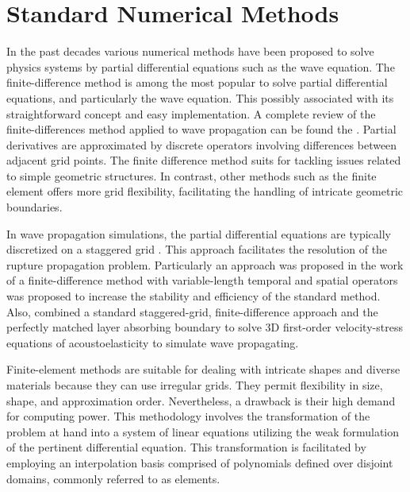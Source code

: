 \documentclass[11pt,twoside]{article}
\begin{document}
\section{Standard Numerical Methods}\label{sec:standard_numerical_methods}

In the past decades various numerical methods have been proposed to solve physics systems by partial differential 
equations such as the wave equation. The finite-difference method is among the most 
popular to solve partial differential equations, and particularly the wave equation. This possibly associated with 
its straightforward concept and easy implementation. A complete review of the finite-differences method applied to 
wave propagation can be found the . Partial derivatives are approximated by discrete operators 
involving differences between adjacent grid points. The finite difference method suits for tackling issues related to 
simple geometric structures. In contrast, other methods such as the finite element offers more grid flexibility, 
facilitating the handling of intricate geometric boundaries.

In wave propagation simulations, the partial differential equations are typically discretized on a staggered grid 
\citep{madariaga_dynamics_1976,Virieux1986}. This approach facilitates the resolution of the rupture propagation 
problem. Particularly an approach was proposed in the work of  a finite-difference method 
with variable-length temporal and spatial operators was proposed to increase the stability and efficiency of the 
standard method. Also,  combined a standard staggered-grid, finite-difference 
approach and the perfectly matched layer absorbing boundary to solve 3D first-order velocity-stress equations of 
acoustoelasticity to simulate wave propagating.

Finite-element methods are suitable for dealing with intricate shapes and diverse materials because they can use 
irregular grids. They permit flexibility in size, shape, and approximation order. Nevertheless, a drawback is their 
high demand for computing power. This methodology involves the transformation of the problem at hand into a system 
of linear equations utilizing the weak formulation of the pertinent differential equation. This transformation is 
facilitated by employing an interpolation basis comprised of polynomials defined over disjoint domains, commonly 
referred to as elements.
\end{document}
